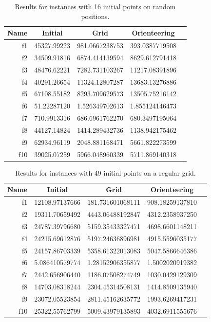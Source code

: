 \documentclass[smallextended]{svjour3}
\begin{document}
\begin{table}[!htbp]
  \centering
  \caption{Results for instances with 16 initial points on random positions.}
%
\begin{tabular}{r|SSSS}
  \toprule
  {Name} & {Initial} & {Grid} & {Orienteering} \\
  \midrule
  f1  & 45327.99223 & 981.0667238753 & 393.0387719508  \\ 
  f2  & 34509.91816 & 6874.414139594 & 8629.612791418  \\ 
  f3  & 48476.62221 & 7282.731103267 & 11217.08391896  \\ 
  f4  & 40291.26654 & 11324.12807287 & 13683.13276886  \\ 
  f5  & 67108.55182 & 8293.709629573 & 13505.75216142  \\ 
  f6  & 51.22287120 & 1.526349702613 & 1.855124146473  \\ 
  f7  & 710.9913316 & 686.6961762270 & 680.3497195064  \\ 
  f8  & 44127.14824 & 1414.289432736 & 1138.942175462  \\ 
  f9  & 62934.96119 & 2048.881168471 & 5661.822273599  \\ 
  f10 & 39025.07259 & 5966.048960339 & 5711.869140318  \\
  \bottomrule
\end{tabular}
  \label{tab:res16b}
\end{table}



\begin{table}[!htbp]
  \centering
  \caption{Results for instances with 49 initial points on a regular grid.}
%
\begin{tabular}{r|SSSS}
  \toprule
  {Name} & {Initial} & {Grid} & {Orienteering} \\
  \midrule
  f1  & 12108.97137666 & 181.731601068111 & 908.18259137810  \\ 
  f2  & 19311.70659492 & 4443.06488192847 & 4312.2358937250  \\ 
  f3  & 24787.39796680 & 5159.35433327471 & 4698.6601148211  \\ 
  f4  & 24215.69612876 & 5197.24636896981 & 4915.5596035177  \\ 
  f5  & 24157.86703339 & 5358.61322013083 & 5047.5866646386  \\ 
  f6  & 5.086410579774 & 1.28152906355877 & 1.5002020919382  \\ 
  f7  & 2442.656906440 & 1186.07508274749 & 1030.0429129309  \\ 
  f8  & 14703.08318244 & 2304.45314508131 & 1414.8509135940  \\ 
  f9  & 23072.05523854 & 2811.45162635772 & 1993.6269417231  \\ 
  f10 & 25322.55762799 & 5009.43979135893 & 4032.6911555676  \\
  \bottomrule
\end{tabular}
  \label{tab:res49a}
\end{table}
\end{document}
